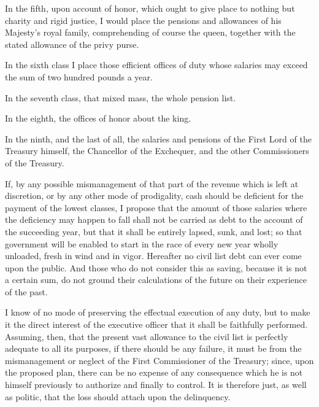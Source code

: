 In the fifth, upon account of honor, which ought to give place to nothing but charity and rigid justice, I would place the pensions and allowances of his Majesty's royal family, comprehending of course the queen, together with the stated allowance of the privy purse.

In the sixth class I place those efficient offices of duty whose salaries may exceed the sum of two hundred pounds a year.

In the seventh class, that mixed mass, the whole pension list.

In the eighth, the offices of honor about the king.

In the ninth, and the last of all, the salaries and pensions of the First Lord of the Treasury himself, the Chancellor of the Exchequer, and the other Commissioners of the Treasury.

If, by any possible mismanagement of that part of the revenue which is left at discretion, or by any other mode of prodigality, cash should be deficient for the payment of the lowest classes, I propose that the amount of those salaries where the deficiency may happen to fall shall not be carried as debt to the account of the succeeding year, but that it shall be entirely lapsed, sunk, and lost; so that government will be enabled to start in the race of every new year wholly unloaded, fresh in wind and in vigor. Hereafter no civil list debt can ever come upon the public. And those who do not consider this as saving, because it is not a certain sum, do not ground their calculations of the future on their experience of the past.

I know of no mode of preserving the effectual execution of any duty, but to make it the direct interest of the executive officer that it shall be faithfully performed. Assuming, then, that the present vast allowance to the civil list is perfectly adequate to all its purposes, if there should be any failure, it must be from the mismanagement or neglect of the First Commissioner of the Treasury; since, upon the proposed plan, there can be no expense of any consequence which he is not himself previously to authorize and finally to control. It is therefore just, as well as politic, that the loss should attach upon the delinquency.

